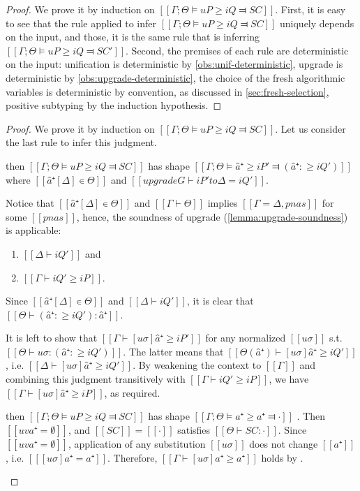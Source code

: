 \obsPosSubtDeterministic*
\begin{proof}
    We prove it by induction on $[[Γ ; Θ ⊨ uP ≥ iQ ⫤ SC]]$.
    First, it is easy to see that the rule applied to infer 
    $[[Γ ; Θ ⊨ uP ≥ iQ ⫤ SC]]$ uniquely depends on the input, 
    and those, it is the same rule that is inferring
    $[[Γ ; Θ ⊨ uP ≥ iQ ⫤ SC']]$.
    Second, the premises of each rule are deterministic on the input: 
    unification is deterministic by \cref{obs:unif-deterministic},
    upgrade is deterministic by \cref{obs:upgrade-deterministic},
    the choice of the fresh algorithmic variables is deterministic by
    convention, as discussed in \cref{sec:fresh-selection},
    positive subtyping by the induction hypothesis.
\end{proof}

\lemPosSubtSoundness*
\begin{proof} 
    We prove it by induction on $[[Γ ; Θ ⊨ uP ≥ iQ ⫤ SC]]$. 
    Let us consider the last rule to infer this judgment.
    \begin{caseof}
    \item {} then
        $[[Γ ; Θ ⊨ uP ≥ iQ ⫤ SC]]$ has shape $[[Γ;Θ ⊨ â⁺ ≥ iP' ⫤ (â⁺ :≥ iQ')]]$ where
        $[[â⁺[Δ] ∊ Θ]]$ and $[[upgrade G ⊢ iP' to Δ = iQ']]$.

        Notice that $[[â⁺[Δ] ∊ Θ]]$ and $[[Γ ⊢ Θ]]$ 
        implies $[[Γ = Δ, pnas]]$ for some $[[pnas]]$, hence, the
        soundness of upgrade (\cref{lemma:upgrade-soundness}) is applicable:
        \begin{enumerate}
            \item $[[Δ ⊢ iQ']]$ and
            \item $[[Γ ⊢ iQ' ≥ iP]]$.
        \end{enumerate}

        Since $[[â⁺[Δ] ∊ Θ]]$ and $[[Δ ⊢ iQ']]$, 
        it is clear that $[[ Θ ⊢ (â⁺ :≥ iQ') : {â⁺}]]$.

        It is left to show that $[[Γ ⊢ [uσ]â⁺ ≥ iP']]$ for any normalized $[[uσ]]$ 
        s.t. $[[ Θ   ⊢ uσ : (â⁺ :≥ iQ') ]]$.
        The latter means that $[[ Θ(â⁺) ⊢ [uσ]â⁺ ≥ iQ' ]]$, i.e. $[[Δ ⊢ [uσ]â⁺ ≥ iQ']]$. 
        By weakening the context to $[[Γ]]$ and combining this judgment
        transitively with $[[Γ ⊢ iQ' ≥ iP]]$, we have $[[Γ ⊢ [uσ]â⁺ ≥ iP]]$,
        as required. 

    \item \label{case:pos-subt-soundness:var}   
        then $[[Γ ; Θ ⊨ uP ≥ iQ ⫤ SC]]$ has shape $[[Γ;Θ ⊨ a⁺ ≥ a⁺ ⫤ ·]]$ .
        Then $[[uv a⁺ = ∅]]$, and $[[SC]] = [[·]]$ satisfies $[[Θ ⊢ SC : ·]]$.
        Since $[[uv a⁺ = ∅]]$, application of any substitution $[[uσ]]$ 
        does not change $[[a⁺]]$, i.e. $[[ [uσ] a⁺ = a⁺]]$.
        Therefore, $[[Γ ⊢ [uσ]a⁺ ≥ a⁺]]$ holds by .


\end{caseof}
\end{proof}
